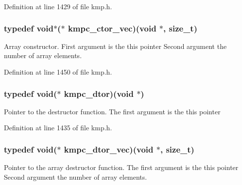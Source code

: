Definition at line 1429 of file kmp.\-h.

\hypertarget{group__THREADPRIVATE_gac1f868aef7d531d34b91eaa57e339f21}{
\subsubsection[{kmpc\-\_\-ctor\-\_\-vec}]{\setlength{\rightskip}{0pt plus 5cm}typedef {\bf void}$\ast$($\ast$ kmpc\-\_\-ctor\-\_\-vec)({\bf void} $\ast$, size\-\_\-t)}}\label{group__THREADPRIVATE_gac1f868aef7d531d34b91eaa57e339f21}
Array constructor. First argument is the {\ttfamily this} pointer Second argument the number of array elements. 

Definition at line 1450 of file kmp.\-h.

\hypertarget{group__THREADPRIVATE_gad8268ac7d007fa1c3351da682c487c0f}{
\subsubsection[{kmpc\-\_\-dtor}]{\setlength{\rightskip}{0pt plus 5cm}typedef {\bf void}($\ast$ kmpc\-\_\-dtor)({\bf void} $\ast$)}}\label{group__THREADPRIVATE_gad8268ac7d007fa1c3351da682c487c0f}
Pointer to the destructor function. The first argument is the {\ttfamily this} pointer 

Definition at line 1435 of file kmp.\-h.

\hypertarget{group__THREADPRIVATE_gab7035b42d465074b31195534efb37e3b}{
\subsubsection[{kmpc\-\_\-dtor\-\_\-vec}]{\setlength{\rightskip}{0pt plus 5cm}typedef {\bf void}($\ast$ kmpc\-\_\-dtor\-\_\-vec)({\bf void} $\ast$, size\-\_\-t)}}\label{group__THREADPRIVATE_gab7035b42d465074b31195534efb37e3b}
Pointer to the array destructor function. The first argument is the {\ttfamily this} pointer Second argument the number of array elements. 

